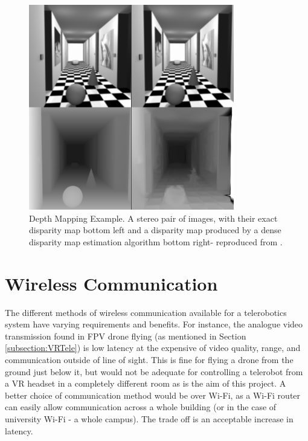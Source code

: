 \begin{figure}[H]
    \begin{center}
      \includegraphics[width=0.8\textwidth]{Figures/depthmap.png}
      \caption[Depth Mapping Example]{Depth Mapping Example. A stereo pair of images, with their exact disparity map bottom left and a disparity map produced by a dense disparity map estimation algorithm bottom right- reproduced from \cite{deptheg}.}
      \label{fig:depthmap}
    \end{center}
\end{figure}

\section{Wireless Communication}

The different methods of wireless communication available for a telerobotics system have varying requirements and benefits. For instance, the analogue video transmission found in FPV drone flying (as mentioned in Section \ref{subsection:VRTele}) is low latency at the expensive of video quality, range, and communication outside of line of sight. This is fine for flying a drone from the ground just below it, but would not be adequate for controlling a telerobot from a VR headset in a completely different room as is the aim of this project. A better choice of communication method would be over Wi-Fi, as a Wi-Fi router can easily allow communication across a whole building (or in the case of university Wi-Fi - a whole campus). The trade off is an acceptable increase in latency.

